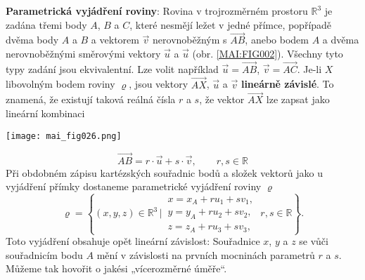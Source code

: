 \wikitextrule
\begin{example}\label{mai:exam004}
  \textbf{Parametrická vyjádření roviny}:\newline\small
  Rovina v trojrozměrném prostoru \(\mathbb{R}^3\) je zadána třemi body \(A\), \(B\) a \(C\), 
  které nesmějí ležet v jedné přímce, popřípadě dvěma body \(A\) a \(B\) a vektorem \(\vec{v}\) 
  nerovnoběžným s \(\overrightarrow{AB}\), anebo bodem \(A\) a dvěma nerovnoběžnými směrovými 
  vektory \(\vec{u}\) a \(\vec{u}\) (obr. \ref{MAI:FIG002}). Všechny tyto typy zadání jsou 
  ekvivalentní. Lze volit například \(\vec{u} = \overrightarrow{AB}\), \(\vec{v} = 
  \overrightarrow{AC}\). Je-li \(X\) libovolným bodem roviny \(\varrho\), jsou vektory 
  \(\overrightarrow{AX}\), \(\vec{u}\) a \(\vec{v}\) \textbf{lineárně závislé}. To znamená, že 
  existují taková reálná čísla \(r\) a \(s\), že vektor \(\overrightarrow{AX}\) lze zapsat jako 
  lineární kombinaci

  {\centering
    \captionsetup{type=figure}
    \texttt{[image: mai\_fig026.png]}
    \par}
  
  \begin{equation*}
    \overrightarrow{AB} = r\cdot\vec{u} + s\cdot\vec{v}, \qquad r,s \in\mathbb{R}
  \end{equation*}
  Při obdobném zápisu kartézských souřadnic bodů a složek vektorů jako u vyjádření přímky dostaneme
  parametrické vyjádření roviny \(\varrho\)
  \begin{equation}\label{mai:eq039}
    \varrho = \left\{(x,y,z)\in\mathbb{R}^3\,|\,
    \begin{matrix}
      x = x_A + ru_1 + sv_1,        \\
      y = y_A + ru_2 + sv_2,        \\
      z = z_A + ru_3 + sv_3,
    \end{matrix}
    \;r,s\in\mathbb{R}
    \right\}.
  \end{equation}
  Toto vyjádření obsahuje opět lineární závislost: Souřadnice \(x\), \(y\) a \(z\) se vůči 
  souřadnicím bodu \(A\) mění v závislosti na prvních mocninách parametrů \(r\) a \(s\). Můžeme tak 
  hovořit o jakési „vícerozměrné úměře“.
  \normalsize
\end{example}
  